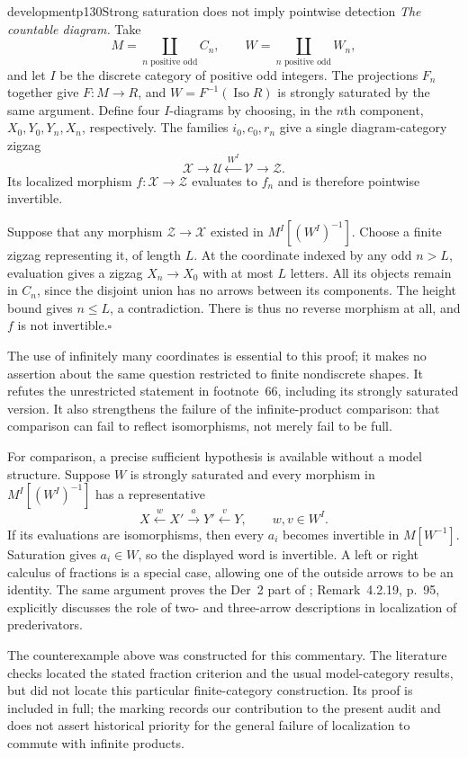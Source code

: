 \begin{dcomment}{development}{p130}{Strong saturation does not imply pointwise detection}
\textit{The countable diagram.}
Take
\[
 M=\coprod_{n\text{ positive odd}}C_n,\qquad
 W=\coprod_{n\text{ positive odd}}W_n,
\]
and let $I$ be the discrete category of positive odd integers. The projections $F_n$ together give $F:M\to R$, and $W=F^{-1}(\operatorname{Iso}R)$ is strongly saturated by the same argument. Define four $I$-diagrams by choosing, in the $n$th component, $X_0,Y_0,Y_n,X_n$, respectively. The families $i_0,c_0,r_n$ give a single diagram-category zigzag
\[
 \mathcal X\longrightarrow\mathcal U
 \xleftarrow{\,W^I\,}\mathcal V\longrightarrow\mathcal Z.
\]
Its localized morphism $f:\mathcal X\to\mathcal Z$ evaluates to $f_n$ and is therefore pointwise invertible.

Suppose that any morphism $\mathcal Z\to\mathcal X$ existed in $M^I[(W^I)^{-1}]$. Choose a finite zigzag representing it, of length $L$. At the coordinate indexed by any odd $n>L$, evaluation gives a zigzag $X_n\to X_0$ with at most $L$ letters. All its objects remain in $C_n$, since the disjoint union has no arrows between its components. The height bound gives $n\leq L$, a contradiction. There is thus no reverse morphism at all, and $f$ is not invertible.\hfill$\square$

The use of infinitely many coordinates is essential to this proof; it makes no assertion about the same question restricted to finite nondiscrete shapes. It refutes the unrestricted statement in footnote~66, including its strongly saturated version. It also strengthens the failure of the infinite-product comparison: that comparison can fail to reflect isomorphisms, not merely fail to be full.

For comparison, a precise sufficient hypothesis is available without a model structure. Suppose $W$ is strongly saturated and every morphism in $M^I[(W^I)^{-1}]$ has a representative
\[
 X\xleftarrow{w}X'\xrightarrow{a}Y'\xleftarrow{v}Y,
 \qquad w,v\in W^I.
\]
If its evaluations are isomorphisms, then every $a_i$ becomes invertible in $M[W^{-1}]$. Saturation gives $a_i\in W$, so the displayed word is invertible. A left or right calculus of fractions is a special case, allowing one of the outside arrows to be an identity. The same argument proves the Der~2 part of \citet[Proposition~4.2.8, pp.~85--86]{LagkasNikolos2018}; Remark~4.2.19, p.~95, explicitly discusses the role of two- and three-arrow descriptions in localization of prederivators.

The counterexample above was constructed for this commentary. The literature checks located the stated fraction criterion and the usual model-category results, but did not locate this particular finite-category construction. Its proof is included in full; the marking records our contribution to the present audit and does not assert historical priority for the general failure of localization to commute with infinite products.
\end{dcomment}

